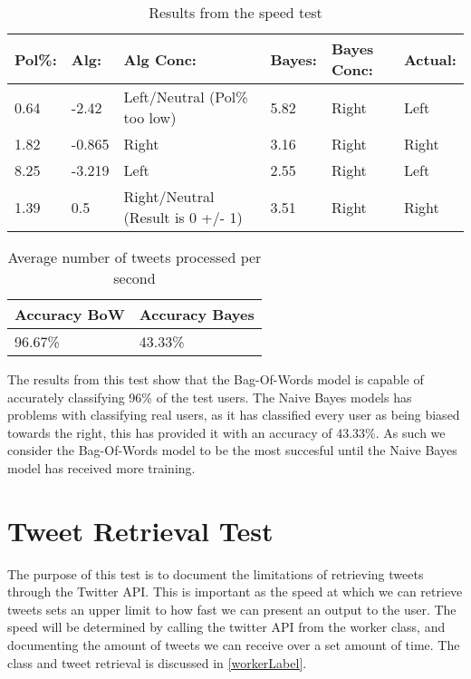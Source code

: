 \begin{table}[H]\centering
\begin{tabular}{|l|l|l|l|l|l|}
\hline
\textbf{Pol\%:}	&	\textbf{Alg:}	&	\textbf{Alg Conc:}							&	\textbf{Bayes:}	&
\textbf{Bayes Conc:}
& \textbf{Actual:}
\\\hline 0.64	&	-2.42	&	Left/Neutral (Pol\% too low)		&	5.82	&	Right		&	Left	\\\hline
1.82	&	-0.865	&	Right								&	3.16	&	Right		&	Right	\\\hline
8.25	&	-3.219	&	Left								&	2.55	&	Right		&	Left	\\\hline
1.39	&	0.5		&	Right/Neutral (Result is 0 +/- 1)	&	3.51	&	Right		&	Right	\\\hline
\end{tabular}
\caption{Results from the speed test}
\label{speedTestReslabel}
\end{table}



\begin{table}[H]\centering
\begin{tabular}{|l|l|}\hline
\textbf{Accuracy BoW}	&	\textbf{Accuracy Bayes}	\\\hline
96.67\%					&	43.33\%					\\\hline	
\end{tabular}
\caption{Average number of tweets processed per second}
\label{AccPercent}
\end{table}

The results from this test show that the Bag-Of-Words model is capable of
accurately classifying 96\% of the test users. The Naive Bayes models has
problems with classifying real users, as it has classified every user as being
biased towards the right, this has provided it with an accuracy of 43.33\%. As
such we consider the Bag-Of-Words model to be the most succesful until the Naive
Bayes model has received more training.

\section{Tweet Retrieval Test}
The purpose of this test is to document the limitations of retrieving tweets
through the Twitter API. This is important as the speed at which we can retrieve
tweets sets an upper limit to how fast we can present an output to the user.
The speed will be determined by calling the twitter API from the worker class,
and documenting the amount of tweets we can receive over a set amount of time.
The  class and tweet retrieval is discussed in
\autoref{workerLabel}.\nl

